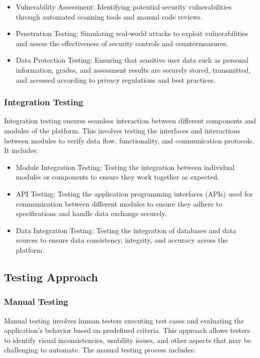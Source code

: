 		\begin{itemize}
			\item Vulnerability Assessment: Identifying potential security vulnerabilities through automated scanning tools and manual code reviews.
			\item Penetration Testing: Simulating real-world attacks to exploit vulnerabilities and assess the effectiveness of security controls and countermeasures.
			\item Data Protection Testing: Ensuring that sensitive user data such as personal information, grades, and assessment results are securely stored, transmitted, and accessed according to privacy regulations and best practices.
		\end{itemize}
		
		\subsubsection{Integration Testing}
		
		Integration testing ensures seamless interaction between different components and modules of the platform. This involves testing the interfaces and interactions between modules to verify data flow, functionality, and communication protocols. It includes:
		
		\begin{itemize}
			\item Module Integration Testing: Testing the integration between individual modules or components to ensure they work together as expected.
			\item API Testing: Testing the application programming interfaces (APIs) used for communication between different modules to ensure they adhere to specifications and handle data exchange securely.
			\item Data Integration Testing: Testing the integration of databases and data sources to ensure data consistency, integrity, and accuracy across the platform.
		\end{itemize}
		
	\subsection{Testing Approach}
		
		\subsubsection{Manual Testing}
		
		Manual testing involves human testers executing test cases and evaluating the application's behavior based on predefined criteria. This approach allows testers to identify visual inconsistencies, usability issues, and other aspects that may be challenging to automate. The manual testing process includes:
		

